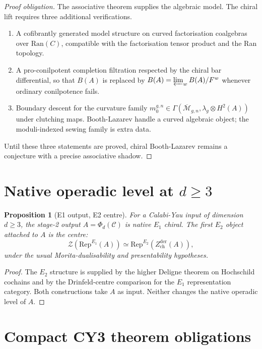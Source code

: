 \documentclass[11pt]{amsart}
\newtheorem{proposition}[theorem]{Proposition}
\newcommand{\cC}{\mathcal{C}}
\newcommand{\Ran}{\mathrm{Ran}}
\newcommand{\Zchder}{Z^{\mathrm{der}}_{\mathrm{ch}}}
\begin{document}
\begin{proof}[Proof obligation]
The associative theorem supplies the algebraic model.  The chiral lift
requires three additional verifications.
\begin{enumerate}
\item A cofibrantly generated model structure on curved factorisation
coalgebras over $\Ran(C)$, compatible with the factorisation tensor
product and the Ran topology.
\item A pro-conilpotent completion filtration respected by the chiral
bar differential, so that $B(A)$ is replaced by
$\widehat B(A)=\varprojlim_w B(A)/F^w$ whenever ordinary conilpotence
fails.
\item Boundary descent for the curvature family
$m_0^{g,n}\in\Gamma(\overline{\mathcal M}_{g,n},
\lambda_g\otimes H^2(A))$ under clutching maps.  Booth-Lazarev handle
a curved algebraic object; the moduli-indexed sewing family is extra
data.
\end{enumerate}
Until these three statements are proved, chiral Booth-Lazarev remains a
conjecture with a precise associative shadow.
\end{proof}

\section{Native operadic level at \texorpdfstring{$d\geq3$}{d >= 3}}

\begin{proposition}[E1 output, E2 centre]
\label{prop:e1-output-e2-centre}
For a Calabi-Yau input of dimension $d\geq3$, the stage-2 output
$A=\Phi_d(\cC)$ is native $E_1$ chiral.  The first $E_2$ object
attached to $A$ is the centre:
\[
 \mathcal Z(\mathrm{Rep}^{E_1}(A))
 \simeq
 \mathrm{Rep}^{E_2}(\Zchder(A)),
\]
under the usual Morita-dualisability and presentability hypotheses.
\end{proposition}

\begin{proof}
The $E_2$ structure is supplied by the higher Deligne theorem on
Hochschild cochains and by the Drinfeld-centre comparison for the
$E_1$ representation category.  Both constructions take $A$ as input.
Neither changes the native operadic level of $A$.
\end{proof}

\section{Compact CY3 theorem obligations}
\end{document}
